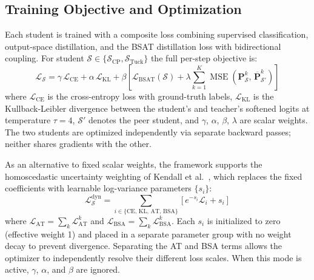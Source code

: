 \documentclass[conference]{IEEEtran}
\begin{document}
\subsection{Training Objective and Optimization}
\label{sec:objective}
\par
Each student is trained with a composite loss combining supervised
classification, output-space distillation, and the BSAT distillation
loss with bidirectional coupling. For student
$\mathcal{S} \in \{\mathcal{S}_{\mathrm{CP}},
\mathcal{S}_{\mathrm{Tuck}}\}$ the full per-step objective is:
\begin{equation}
    \mathcal{L}_{\mathcal{S}} =
    \gamma \,\mathcal{L}_{\mathrm{CE}}
    + \alpha \,\mathcal{L}_{\mathrm{KL}}
    + \beta \!\left[
        \mathcal{L}_{\mathrm{BSAT}}(\mathcal{S})
        + \lambda \sum_{k=1}^{K}
        \operatorname{MSE}\!\left(\mathbf{P}_{\mathcal{S}}^k,\,
        \overline{\mathbf{P}}_{\mathcal{S}'}^k\right)
    \right]
    \label{eq:total_loss}
\end{equation}
where $\mathcal{L}_{\mathrm{CE}}$ is the cross-entropy loss with
ground-truth labels, $\mathcal{L}_{\mathrm{KL}}$ is the
Kullback-Leibler divergence between the student's and teacher's
softened logits at temperature $\tau = 4$, $\mathcal{S}'$ denotes
the peer student, and $\gamma$, $\alpha$, $\beta$, $\lambda$ are
scalar weights. The two students are optimized independently via
separate backward passes; neither shares gradients with the other.

\par
As an alternative to fixed scalar weights, the framework supports
the homoscedastic uncertainty weighting of Kendall
et al.~\cite{kendall2018multi}, which replaces the fixed coefficients
with learnable log-variance parameters $\{s_i\}$:
\begin{equation}
    \mathcal{L}_{\mathcal{S}}^{\mathrm{dyn}} =
    \sum_{i \in \{\mathrm{CE},\,\mathrm{KL},\,\mathrm{AT},\,\mathrm{BSA}\}}
    \left[ e^{-s_i} \mathcal{L}_i + s_i \right]
\end{equation}
where $\mathcal{L}_\mathrm{AT} = \sum_k \mathcal{L}_{\mathrm{AT}}^k$ and
$\mathcal{L}_\mathrm{BSA} = \sum_k \mathcal{L}_{\mathrm{BSA}}^k$.
Each $s_i$ is initialized to zero (effective weight 1) and placed
in a separate parameter group with no weight decay to prevent
divergence. Separating the AT and BSA terms allows the optimizer
to independently resolve their different loss scales. When this
mode is active, $\gamma$, $\alpha$, and $\beta$ are ignored.
\end{document}
